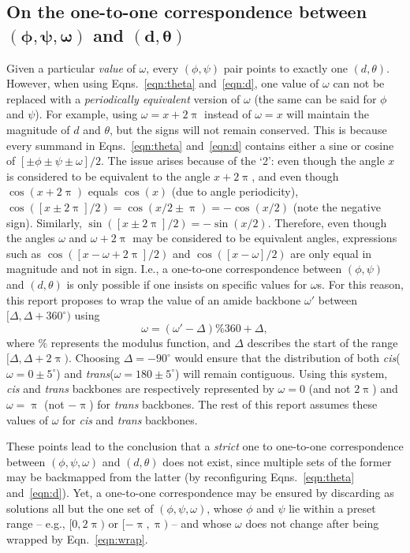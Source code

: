 \documentclass[fleqn,10pt,lineno]{wlpeerj} %
\newcommand{\n}[1]{{\color{black}#1}} %
\newcommand{\Eqn}[1]{Eqn.~\ref{#1}}
\newcommand{\Eqns}[1]{Eqns.~\ref{#1}}
\newcommand{\cis}{{\em{cis}}\xspace}
\newcommand{\trans}{{\em{trans}}\xspace}
\begin{document}
\subsection*{On the one-to-one correspondence between $\bm{(\phi,\psi,\omega)}$ and $\bm{(d,\theta)}$}
Given a particular {\it value} of $\omega$, every $(\phi,\psi)$ pair points to exactly one $(d,\theta)$. However, when using \Eqns{eqn:theta} and~\ref{eqn:d}, one value of $\omega$ can not be replaced with a {\em periodically equivalent} version of $\omega$ \n{(the same can be said for $\phi$ and $\psi$)}. For example, using $\omega=x+2\uppi$ instead of $\omega=x$ will maintain the magnitude of $d$ and $\theta$, but the signs will not remain conserved. This is because every summand in \Eqns{eqn:theta} and~\ref{eqn:d} contains either a sine or cosine of $[\pm\phi \pm\psi \pm\omega]/2$. The issue arises because of the `2': even though the angle $x$ is considered to be equivalent to the angle $x+2\uppi$, and even though $\cos(x+2\uppi)$ equals $\cos(x)$ (due to angle periodicity), $\cos([x \pm 2\uppi]/2) = \cos(x/2 \pm \uppi) = -\cos(x/2)$ (note the negative sign). Similarly, $\sin([x \pm 2\uppi]/2) = -\sin(x/2)$. Therefore, even though the angles $\omega$ and $\omega+2\uppi$ may be considered to be equivalent angles, expressions such as $\cos([x-\omega + 2\uppi]/2)$ and $\cos([x-\omega]/2)$ are only equal in magnitude and not in sign. I.e., a one-to-one correspondence between $(\phi,\psi)$ and $(d,\theta)$ is only possible if one insists on specific values for $\omega$s. For this reason, this report proposes to wrap the value of an amide backbone  $\omega'$ between $[\Delta,\Delta+360^\circ)$ using 
\begin{equation}
\label{eqn:wrap}
\omega = ( \omega' - \Delta ) \% 360 + \Delta,
\end{equation}
where $\%$ represents the modulus function, and $\Delta$ describes the start of the range \n{$[\Delta,\Delta+2\uppi)$}. Choosing $\Delta=-90^\circ$ would ensure that the distribution of both \cis ($\omega = 0 \pm 5^\circ$) and \trans ($\omega = 180\pm 5^\circ$)  will remain contiguous. %
Using this system, \cis and \trans backbones are respectively represented by $\omega=0$ (and not $2\uppi$) and $\omega=\uppi$ (not $-\uppi$) for \trans backbones. The rest of this report assumes these values of $\omega$ for \cis and \trans backbones.

These points lead to the conclusion that a {\em strict} one to one-to-one correspondence between $(\phi,\psi,\omega)$ and $(d,\theta)$ does not exist, since multiple sets of the former may be backmapped from the latter (by reconfiguring \Eqns{eqn:theta} and~\ref{eqn:d}). Yet, a one-to-one correspondence may be ensured by discarding as solutions all but the one set of $(\phi,\psi,\omega)$, whose \n{$\phi$ and $\psi$ lie within a preset range -- e.g., $[0,2\uppi)$ or $[-\uppi,\uppi)$ -- and whose $\omega$} does not change after being wrapped by \Eqn{eqn:wrap}.
\end{document}
